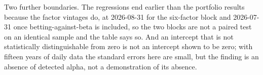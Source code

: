 Two further boundaries. The regressions end earlier than the portfolio results
because the factor vintages do, at 2026-08-31 for the six-factor block and
2026-07-31 once betting-against-beta is included, so the two blocks are not a
paired test on an identical sample and the table says so. And an intercept that
is not statistically distinguishable from zero is not an intercept shown to be
zero; with fifteen years of daily data the standard errors here are small, but
the finding is an absence of detected alpha, not a demonstration of its
absence.
